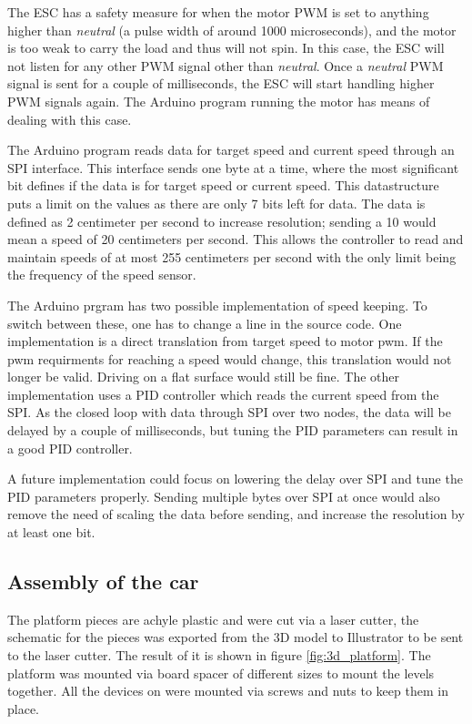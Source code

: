 \documentclass[11pt, titlepage]{article} %
\begin{document}
The ESC has a safety measure for when the motor PWM is set to anything higher than \textit{neutral} (a pulse width of around 1000 microseconds), and the motor is too weak to carry the load and thus will not spin. In this case, the ESC will not listen for any other PWM signal other than \textit{neutral}. Once a \textit{neutral} PWM signal is sent for a couple of milliseconds, the ESC will start handling higher PWM signals again. The Arduino program running the motor has means of dealing with this case.

The Arduino program reads data for target speed and current speed through an SPI interface. This interface sends one byte at a time, where the most significant bit defines if the data is for target speed or current speed. This datastructure puts a limit on the values as there are only 7 bits left for data. The data is defined as 2 centimeter per second to increase resolution; sending a 10 would mean a speed of 20 centimeters per second. This allows the controller to read and maintain speeds of at most 255 centimeters per second with the only limit being the frequency of the speed sensor. 

The Arduino prgram has two possible implementation of speed keeping. To switch between these, one has to change a line in the source code. One implementation is a direct translation from target speed to motor pwm. If the pwm requirments for reaching a speed would change, this translation would not longer be valid. Driving on a flat surface would still be fine. The other implementation uses a PID controller which reads the current speed from the SPI. As the closed loop with data through SPI over two nodes, the data will be delayed by a couple of milliseconds, but tuning the PID parameters can result in a good PID controller.

A future implementation could focus on lowering the delay over SPI and tune the PID parameters properly. Sending multiple bytes over SPI at once would also remove the need of scaling the data before sending, and increase the resolution by at least one bit.

\subsection{Assembly of the car}


The platform pieces are achyle plastic and were cut via a laser cutter, the schematic for the pieces was exported from the 3D model to Illustrator to be sent to the laser cutter. The result of it is shown in figure \ref{fig:3d_platform}. The platform was mounted via board spacer of different sizes to mount the levels together. All the devices on were mounted via screws and nuts to keep them in place. 
\end{document}
